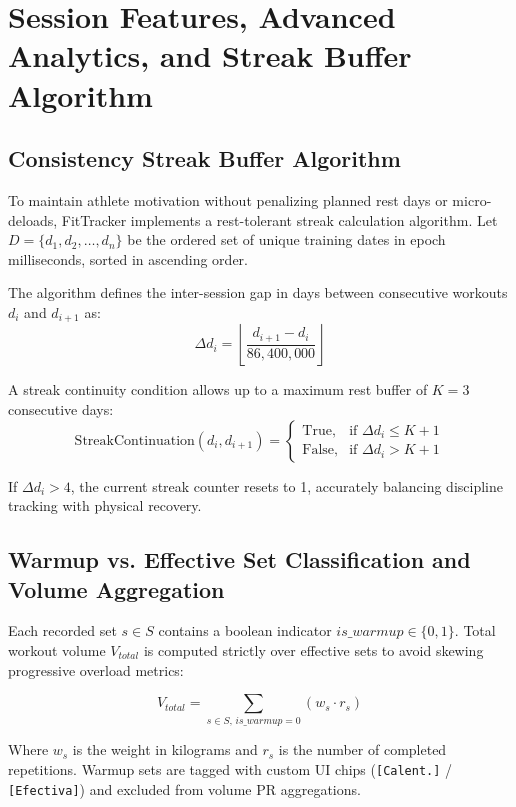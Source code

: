\section{Session Features, Advanced Analytics, and Streak Buffer Algorithm}

\subsection{Consistency Streak Buffer Algorithm}
To maintain athlete motivation without penalizing planned rest days or micro-deloads, FitTracker implements a rest-tolerant streak calculation algorithm. Let $D = \{d_1, d_2, \dots, d_n\}$ be the ordered set of unique training dates in epoch milliseconds, sorted in ascending order.

The algorithm defines the inter-session gap in days between consecutive workouts $d_i$ and $d_{i+1}$ as:
\begin{equation}
\Delta d_i = \left\lfloor \frac{d_{i+1} - d_i}{86,400,000} \right\rfloor
\end{equation}

A streak continuity condition allows up to a maximum rest buffer of $K = 3$ consecutive days:
\begin{equation}
\text{StreakContinuation}(d_i, d_{i+1}) = 
\begin{cases} 
\text{True}, & \text{if } \Delta d_i \le K + 1 \\ 
\text{False}, & \text{if } \Delta d_i > K + 1 
\end{cases}
\end{equation}

If $\Delta d_i > 4$, the current streak counter resets to 1, accurately balancing discipline tracking with physical recovery.

\subsection{Warmup vs. Effective Set Classification and Volume Aggregation}
Each recorded set $s \in S$ contains a boolean indicator $is\_warmup \in \{0, 1\}$. Total workout volume $V_{total}$ is computed strictly over effective sets to avoid skewing progressive overload metrics:

\begin{equation}
V_{total} = \sum_{s \in S, \, is\_warmup = 0} (w_s \cdot r_s)
\end{equation}

Where $w_s$ is the weight in kilograms and $r_s$ is the number of completed repetitions. Warmup sets are tagged with custom UI chips (\texttt{[Calent.]} / \texttt{[Efectiva]}) and excluded from volume PR aggregations.


